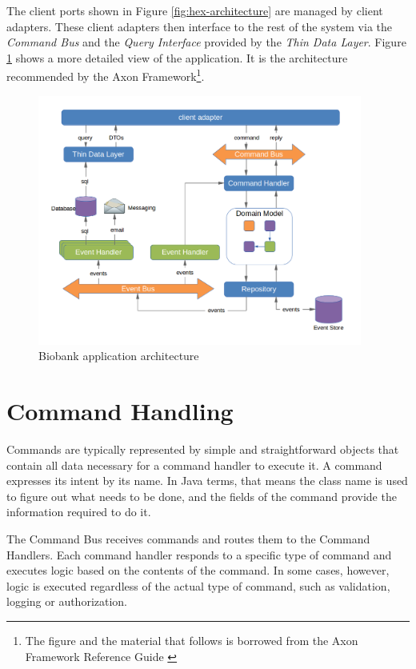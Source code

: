 The client ports shown in Figure \ref{fig:hex-architecture} are managed by
client adapters. These client adapters then interface to the rest of the system
via the \emph{Command Bus} and the \emph{Query Interface} provided by the
\emph{Thin Data Layer}. Figure \ref{fig:cqrs-architecture} shows a more detailed
view of the application. It is the architecture recommended by the Axon
Framework\footnote{The figure and the material that follows is borrowed from
  the Axon Framework Reference Guide \cite{AxonOnline}}.

\begin{figure}[h]
\includegraphics[width=0.95\textwidth]{images/cqrs-architecture}
\caption{Biobank application architecture}
\label{fig:cqrs-architecture}
\end{figure}

\section*{Command Handling}

Commands are typically represented by simple and straightforward objects that
contain all data necessary for a command handler to execute it. A command
expresses its intent by its name. In Java terms, that means the class name is
used to figure out what needs to be done, and the fields of the command provide
the information required to do it.

The Command Bus receives commands and routes them to the Command Handlers. Each
command handler responds to a specific type of command and executes logic based
on the contents of the command. In some cases, however, logic is executed
regardless of the actual type of command, such as validation, logging or
authorization.

